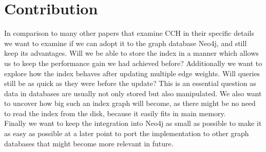 \section{Contribution}

In comparison to many other papers that examine CCH in their specific details we want to examine if we can adopt it to the graph database Neo4j, and still keep its advantages.
Will we be able to store the index in a manner which allows us to keep the performance gain we had achieved before?
Additionally we want to explore how the index behaves after updating multiple edge weights.
Will queries still be as quick as they were before the update?
This is an essential question as data in databases are usually not only stored but also manipulated.
We also want to uncover how big such an index graph will become, as there might be no need to read the index from the disk, because it easily fits in main memory.
\\
Finally we want to keep the integration into Neo4j as small as possible to make it as easy as possible at a later point to port the implementation to other graph databases that might become more relevant in future.
